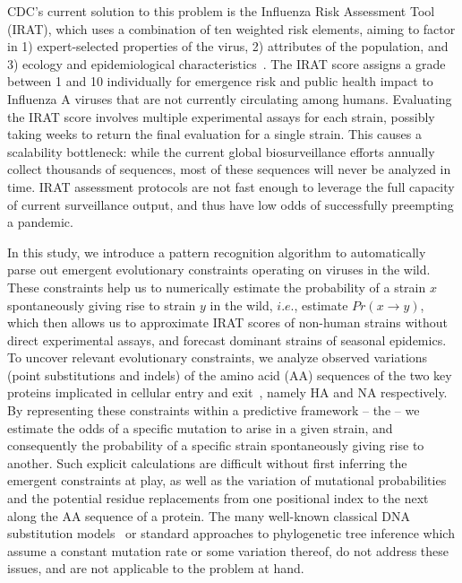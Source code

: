 \documentclass[onecolumn, compsoc,10pt]{IEEEtran}
\begin{document}
CDC's current solution to this problem is the Influenza Risk Assessment Tool (IRAT), which  uses a combination of ten weighted risk elements, aiming to factor in   1) expert-selected properties of the virus, 2) attributes of the population, and 3) ecology and epidemiological characteristics~\cite{Influenz24:online}. The IRAT score assigns  a grade between 1 and 10 individually for emergence risk and public health impact to Influenza A viruses that are not currently circulating among humans. Evaluating the IRAT score  involves multiple experimental assays for each strain, possibly taking  weeks to return the final   evaluation for a single strain. This causes  a scalability bottleneck: while  the current global biosurveillance efforts annually  collect  thousands of sequences, most of these sequences will never be analyzed in time. IRAT assessment protocols are  not fast enough to leverage the full capacity of current surveillance output, and thus have low odds of successfully  preempting a pandemic.

In this study, we introduce a pattern recognition algorithm to automatically parse out emergent evolutionary constraints operating on \infl viruses in the wild. These constraints help us to  numerically estimate the probability of a strain $x$ spontaneously giving rise to strain $y$  in the wild, $i.e.$, estimate  $Pr(x \rightarrow y)$, which then allows us to approximate IRAT scores of non-human strains without direct experimental assays, and forecast dominant strains of seasonal epidemics. To uncover relevant evolutionary constraints, we analyze observed variations (point substitutions and indels) of the  amino acid (AA)  sequences  of the two key proteins implicated  in cellular entry and exit~\cite{gamblin2010influenza}, namely HA and NA respectively. By representing these constraints within a predictive framework -- the \enet -- we estimate the  odds of a specific mutation to arise in a given strain, and consequently the probability of a specific strain spontaneously  giving rise to another.  Such explicit calculations are difficult  without first inferring the emergent constraints at play,  as well as  the variation of mutational probabilities and the potential residue replacements from one positional index to the next along the AA sequence of a protein. The many well-known classical  DNA  substitution models~\cite{posada1998modeltest} or standard approaches to phylogenetic tree inference which assume a constant mutation rate or some variation thereof, do not address these issues, and are not applicable to the problem at hand. 
\end{document}

